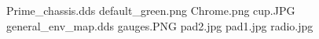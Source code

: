 Prime_chassis.dds
default_green.png
Chrome.png
cup.JPG
general_env_map.dds
gauges.PNG
pad2.jpg
pad1.jpg
radio.jpg

